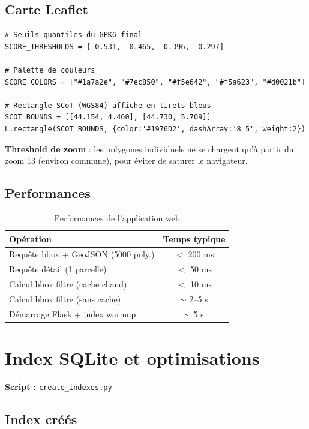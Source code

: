 \documentclass[11pt,a4paper]{report}
\newcommand{\code}[1]{\texttt{\small #1}}
\begin{document}
\subsection{Carte Leaflet}

\begin{lstlisting}[language=Python3, caption={Seuils de score et couleurs (app\_carte2.py)}]
# Seuils quantiles du GPKG final
SCORE_THRESHOLDS = [-0.531, -0.465, -0.396, -0.297]

# Palette de couleurs
SCORE_COLORS = ["#1a7a2e", "#7ec850", "#f5e642", "#f5a623", "#d0021b"]

# Rectangle SCoT (WGS84) affiche en tirets bleus
SCOT_BOUNDS = [[44.154, 4.460], [44.730, 5.709]]
L.rectangle(SCOT_BOUNDS, {color:'#1976D2', dashArray:'8 5', weight:2})
\end{lstlisting}

\textbf{Threshold de zoom} : les polygones individuels ne se chargent qu'à partir du zoom 13 (environ commune), pour éviter de saturer le navigateur.

\subsection{Performances}

\begin{table}[H]
\centering
\begin{tabular}{lc}
\toprule
\rowcolor{seuilgris!75}
\textbf{Opération} & \textbf{Temps typique} \\
\midrule
Requête bbox + GeoJSON (5000 poly.) & $<$ 200 ms \\
Requête détail (1 parcelle) & $<$ 50 ms \\
Calcul bbox filtre (cache chaud) & $<$ 10 ms \\
Calcul bbox filtre (sans cache) & $\sim$ 2–5 s \\
Démarrage Flask + index warmup & $\sim$ 5 s \\
\bottomrule
\end{tabular}
\caption{Performances de l'application web}
\end{table}

\section{Index SQLite et optimisations}

\textbf{Script :} \code{create\_indexes.py}

\subsection{Index créés}
\end{document}
